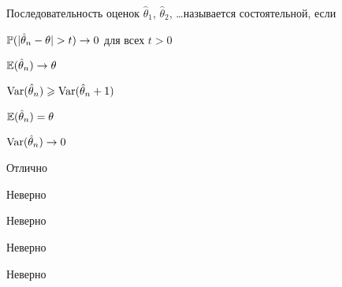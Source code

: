 
\begin{question}
Последовательность оценок \(\hat{\theta}_1\), \(\hat{\theta}_2\),
\ldots называется состоятельной, если
\begin{answerlist}
  \item \(\P(|\hat\theta_n - \theta |>t)\to 0\) для всех \(t>0\)
  \item \(\operatorname{\mathbb{E}}(\hat\theta_n)\to \theta\)
  \item \(\operatorname{Var}(\hat\theta_n)\geqslant \operatorname{Var}(\hat\theta_n+1)\)
  \item \(\operatorname{\mathbb{E}}(\hat\theta_n)=\theta\)
  \item \(\operatorname{Var}(\hat\theta_n)\to 0\)
\end{answerlist}
\end{question}

\begin{solution}
\begin{answerlist}
  \item Отлично
  \item Неверно
  \item Неверно
  \item Неверно
  \item Неверно
\end{answerlist}
\end{solution}

